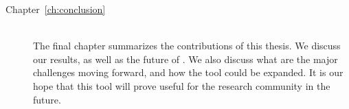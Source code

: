 \begin{description}
    \item[Chapter~\ref{ch:conclusion}] \hfill \\

        The final chapter summarizes the contributions of this thesis.
        We discuss our results, as well as the future of \demo. We also
        discuss what are the major challenges moving forward, and how
        the tool could be expanded. It is our hope that this tool will
        prove useful for the research community in the future.


\end{description}
